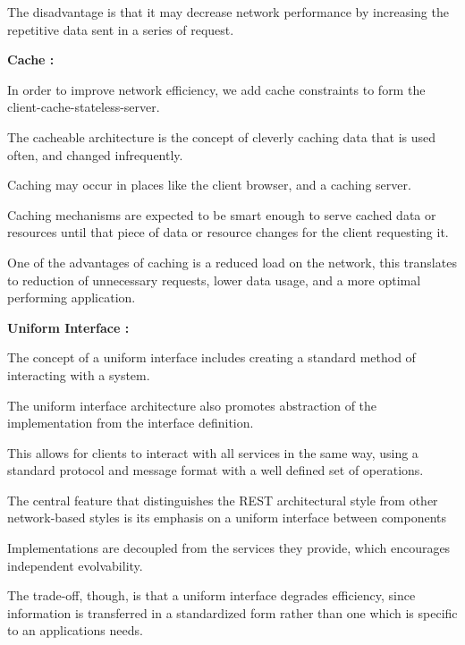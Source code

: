 \begin{DoxyItemize}
\begin{DoxyItemize}
\item The disadvantage is that it may decrease network performance by increasing the repetitive data sent in a series of request. 
\end{DoxyItemize}
\item {\bfseries Cache \+:}
\begin{DoxyItemize}
\item In order to improve network efficiency, we add cache constraints to form the client-\/cache-\/stateless-\/server.
\item The cacheable architecture is the concept of cleverly caching data that is used often, and changed infrequently.
\item Caching may occur in places like the client browser, and a caching server.
\item Caching mechanisms are expected to be smart enough to serve cached data or resources until that piece of data or resource changes for the client requesting it.
\item One of the advantages of caching is a reduced load on the network, this translates to reduction of unnecessary requests, lower data usage, and a more optimal performing application. 
\end{DoxyItemize}
\item {\bfseries Uniform Interface \+:}
\begin{DoxyItemize}
\item The concept of a uniform interface includes creating a standard method of interacting with a system.
\item The uniform interface architecture also promotes abstraction of the implementation from the interface definition.
\item This allows for clients to interact with all services in the same way, using a standard protocol and message format with a well defined set of operations.
\item The central feature that distinguishes the R\+E\+ST architectural style from other network-\/based styles is its emphasis on a uniform interface between components
\item Implementations are decoupled from the services they provide, which encourages independent evolvability.
\item The trade-\/off, though, is that a uniform interface degrades efficiency, since information is transferred in a standardized form rather than one which is specific to an application\textquotesingle{}s needs. 
\end{DoxyItemize}

\end{DoxyItemize}
